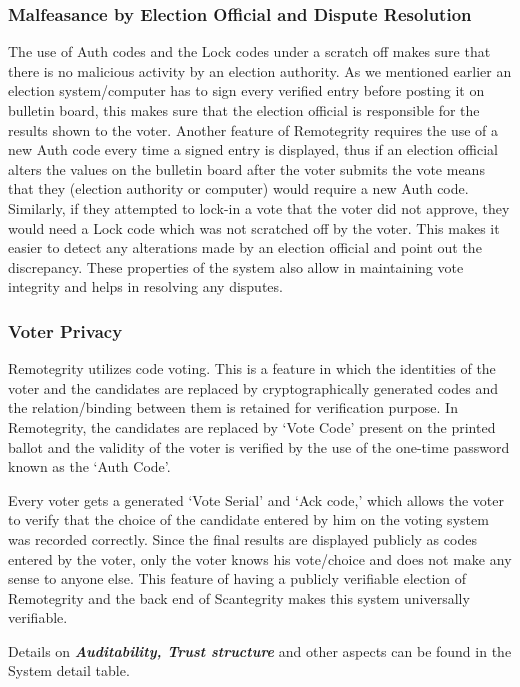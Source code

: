 \subsubsection{Malfeasance by Election Official and Dispute Resolution}

The use of Auth codes and the Lock codes under a scratch off makes sure that there is no malicious activity by an election authority. As we mentioned earlier an election system/computer has to sign every verified entry before posting it on bulletin board, this makes sure that the election official is responsible for the results shown to the voter. Another feature of Remotegrity requires the use of a new Auth code every time a signed entry is displayed, thus if an election official alters the values on the bulletin board after the voter submits the vote means that they (election authority or computer) would require a new Auth code. Similarly, if they attempted to lock-in a vote that the voter did not approve, they would need a Lock code which was not scratched off by the voter. This makes it easier to detect any alterations made by an election official and point out the discrepancy. These properties of the system also allow in maintaining vote integrity and helps in resolving any disputes.

\subsubsection{Voter Privacy}

Remotegrity utilizes code voting. This is a feature in which the identities of the voter and the candidates are replaced by cryptographically generated codes and the relation/binding between them is retained for verification purpose. In Remotegrity, the candidates are replaced by `Vote Code' present on the printed ballot and the validity of the voter is verified by the use of the one-time password known as the `Auth Code'.

Every voter gets a generated `Vote Serial' and `Ack code,' which allows the voter to verify that the choice of the candidate entered by him on the voting system was recorded correctly. Since the final results are displayed publicly as codes entered by the voter, only the voter knows his vote/choice and does not make any sense to anyone else. This feature of having a publicly verifiable election of Remotegrity and the back end of Scantegrity makes this system universally verifiable.

Details on \textbf{\textit{Auditability, Trust structure }}and other aspects can be found in the System detail table.

